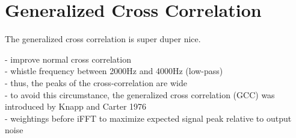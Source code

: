 \section{Generalized Cross Correlation}
The generalized cross correlation is super duper nice.

- improve normal cross correlation\\
- whistle frequency between 2000Hz and 4000Hz (low-pass)\\
- thus, the peaks of the cross-correlation are wide\\
- to avoid this circumstance, the generalized cross correlation (GCC)
was introduced by Knapp and Carter 1976 \cite{Knapp_Carter_GCC} \\
- weightings before iFFT to maximize expected signal peak relative
to output noise \cite{Hassab_Boucher_GCC}